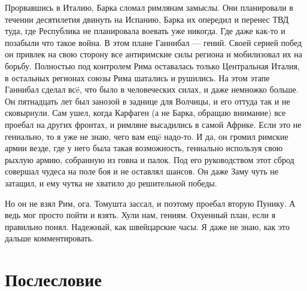 Прорвавшись в Италию, Барка сломал римлянам замыслы. Они планировали в течении десятилетия двинуть на Испанию, Барка их опередил и перенес ТВД туда, где Республика не планировала воевать уже никогда. Где даже как-то и позабыли что такое война. В этом плане Ганнибал — гений. Своей серией побед он привлек на свою сторону все антиримские силы региона и мобилизовал их на борьбу. Полностью под контролем Рима оставалась только Центральная Италия, в остальных регионах союзы Рима шатались и рушились. На этом этапе Ганнибал сделал всë, что было в человеческих силах, и даже немножко больше. Он пятнадцать лет был занозой в заднице для Волчицы, и его оттуда так и не сковырнули. Сам ушел, когда Карфаген (а не Барка, обращаю внимание) все проебал на других фронтах, и римляне высадились в самой Африке. Если это не гениально, то я уже не знаю, чего вам ещë надо-то. И да, он громил римские армии везде, где у него была такая возможность, гениально используя свою рыхлую армию, собранную из говна и палок. Под его руководством этот сброд совершал чудеса на поле боя и не оставлял шансов. Он даже Заму чуть не затащил, и ему чутка не хватило до решительной победы.


Но он не взял Рим, ога. Томушта зассал, и поэтому проебал вторую Пунику. А ведь мог просто пойти и взять. Хули нам, гениям. Охуенный план, если я правильно понял. Надежный, как швейцарские часы. Я даже не знаю, как это дальше комментировать.

\section{Послесловие}

